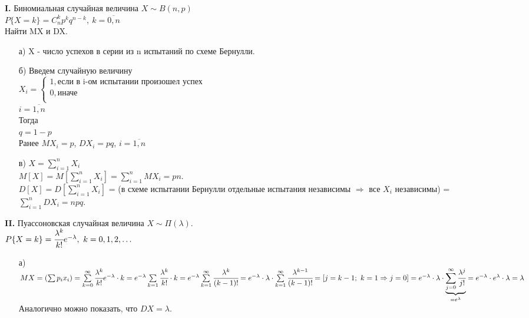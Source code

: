 

\textbf{I.} Биномиальная случайная величина $X \sim B(n,p)$ \\
$P\{X = k\} = C^k_n p^k q^{n-k}, \ k = \overline{0,n}$ \\
Найти MX и DX.\\
\begin{enumerate}
	\item[а)] X - число успехов в серии из n испытаний по схеме Бернулли.
	
	\item[б)] Введем случайную величину\\
	$X_i = 
	\begin{cases}
		1, \text{если в i-ом испытании произошел успех} \\
		0, \text{иначе}\\
	\end{cases}$\\
	$i = \overline{1,n}$\\
	Тогда\\
	$q = 1 - p$\\
	Ранее $MX_i = p$, $DX_i = pq$, $i = \overline{1,n}$
	
	\item[в)] $X = \sum\limits_{i = 1}^n X_i$\\
	$M[X] = M\left[\sum\limits_{i = 1}^n X_i\right] = \sum\limits_{i = 1}^n MX_i = pn$.\\
	$D[X] = D\left[\sum\limits_{i = 1}^n X_i\right]$ = (в схеме испытании Бернулли отдельные испытания независимы $\Rightarrow$ все $X_i$ независимы) = $\sum\limits_{i = 1}^n DX_i = npq$.\\
\end{enumerate}


\textbf{II.} Пуассоновская случайная величина $X \sim \Pi(\lambda)$.\\
$P\{X = k\} = \cfrac{\lambda^k}{k!} e^{-\lambda}, \ k = 0, 1, 2, \ldots$\\
\begin{enumerate}
	\item[а)] 
	\begin{math} 
	MX = \left(\sum p_i x_i\right) = 
	\sum\limits_{k = 0}^\infty \cfrac{\lambda^k}{k!} e^{-\lambda} \cdot k = 
	e^{-\lambda} \sum\limits_{k = 1} \cfrac{\lambda^k}{k!} \cdot k = 
	e^{-\lambda} \sum\limits_{k = 1}^\infty \cfrac{\lambda^k}{(k - 1)!} = 
	e^{-\lambda} \cdot \lambda \cdot \sum\limits_{k = 1}^\infty \cfrac{\lambda^{k - 1}}{(k - 1)!} = 
	\left[j = k - 1; \ k = 1 \Rightarrow j = 0\right]= 
	e^{-\lambda} \cdot \lambda \cdot \underbrace{\sum\limits_{j = 0}^\infty \cfrac{\lambda^j}{j!}}_{= e^\lambda} = e^{-\lambda} \cdot e^\lambda \cdot \lambda = \lambda
	\end{math}
	Аналогично можно показать, что $DX = \lambda$.
\end{enumerate}


